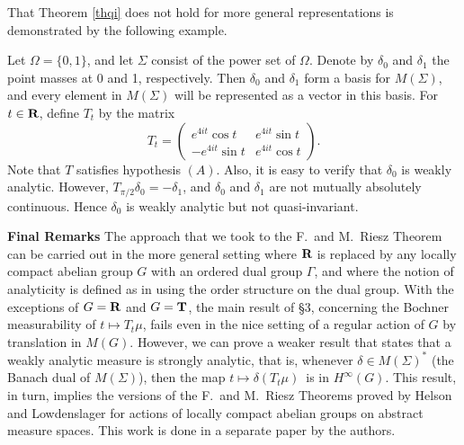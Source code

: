 \bigskip

That Theorem \ref{thqi} does not hold for more 
general representations is demonstrated by the following example.
\begin{exqi}
{\rm
Let $\Omega=\{0,1\}$, and let $\Sigma$ 
consist of the power set of $\Omega$.  Denote by 
$\delta_0$ and $\delta_1$ the point masses at 0 
and 1, respectively.  Then $ \delta_0$ and $\delta_1$ 
form a basis for $M(\Sigma)$, and every element 
in $M(\Sigma)$ will be represented as a vector 
in this basis.  For $t\in\R$, define $T_t$ by the matrix
\[ T_t=\left(
\begin{array}{cc}
e^{4 i t}\cos t & e^{4 i t}\sin t \\
- e^{4 i t}\sin t & e^{4 i t}\cos t 
\end{array}
\right).\]
Note that $T$ satisfies hypothesis $(A)$.  
Also, it is easy to verify that $\delta_0$ is 
weakly analytic.  However, $T_{\pi/2}\delta_0=-\delta_1$, 
and $\delta_0$ and $\delta_1$ are not mutually absolutely continuous.
Hence $\delta_0$ is weakly analytic but not quasi-invariant.
}
\label{exqi}
\end{exqi}
{\bf Final Remarks}  The approach that we took to the 
F.\ and M.\ Riesz Theorem can be carried out in the more general setting
where $\R$ is replaced by any locally compact abelian group $G$
with an ordered dual group $\Gamma$, and where the notion
of analyticity is defined as in \cite{hl1} using the order
structure on the dual group.
With the exceptions of $G=\R$ and $G=\T$, the main result of
\S 3, concerning the Bochner measurability of $t\mapsto T_t\mu$, fails
even in the nice setting of a regular action of $G$ by translation in 
$M(G)$.  However, we can prove a weaker result that states that 
a weakly analytic measure is strongly analytic, that is, whenever
$\delta \in M(\Sigma)^*$ (the Banach dual of $M(\Sigma)$), then the map $t\mapsto\delta(T_t \mu)$\ is
in $H^\infty(G)$.  This result, in turn, implies the
versions of the F.\ and M.\ Riesz 
Theorems proved by Helson and Lowdenslager \cite{hl1} 
for actions of locally compact abelian groups
on abstract measure spaces.  This work 
is done in a separate paper by the authors.

